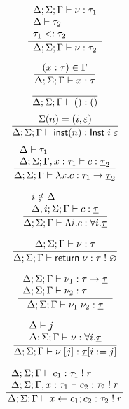 \[\frac{
	\begin{array}{l}
	\Delta;\Sigma;\Gamma \vdash \nu : \tau_1 \\
	\Delta \vdash \tau_2 \\
	\tau_1 <: \tau_2
	\end{array}
}{
	\Delta;\Sigma;\Gamma \vdash \nu : \tau_2
}\]

\[\frac{
	(x:\tau) \in \Gamma
}{
	\Delta;\Sigma;\Gamma \vdash x : \tau
}\]
\[\frac{
}{
	\Delta;\Sigma;\Gamma \vdash () : ()
}\]
\[\frac{
	\Sigma(n) = (i, \varepsilon)
}{
	\Delta;\Sigma;\Gamma \vdash \mathsf{inst}(n) : \mathsf{Inst} \; i \; \varepsilon
}\]
\[\frac{
	\begin{array}{l}
	\Delta \vdash \tau_1 \\
	\Delta;\Sigma;\Gamma, x : \tau_1 \vdash c : \underline{\tau}_2
	\end{array}
}{
	\Delta;\Sigma;\Gamma \vdash \lambda x . c : \tau_1 \rightarrow \underline{\tau}_2
}\]

\[\frac{
	\begin{array}{l}
	i \notin \Delta\\
	\Delta,i;\Sigma;\Gamma \vdash c : \underline{\tau}
	\end{array}
}{
	\Delta;\Sigma;\Gamma \vdash \Lambda i . c : \forall i . \underline{\tau}
}\]

\[\frac{
	\begin{array}{l}
	\Delta;\Sigma;\Gamma \vdash \nu : \tau
	\end{array}
}{
	\Delta;\Sigma;\Gamma \vdash \mathsf{return} \; \nu : \tau \; ! \; \varnothing
}\]

\[\frac{
	\begin{array}{l}
	\Delta;\Sigma;\Gamma \vdash \nu_1 : \tau \rightarrow \underline{\tau}\\
	\Delta;\Sigma;\Gamma \vdash \nu_2 : \tau
	\end{array}
}{
	\Delta;\Sigma;\Gamma \vdash \nu_1 \; \nu_2 : \underline{\tau}
}\]

\[\frac{
	\begin{array}{l}
	\Delta \vdash j \\
	\Delta;\Sigma;\Gamma \vdash \nu : \forall i . \underline{\tau}
	\end{array}
}{
	\Delta;\Sigma;\Gamma \vdash \nu \; [ j ] : \underline{\tau}[i := j]
}\]

\[\frac{
	\begin{array}{l}
	\Delta;\Sigma;\Gamma \vdash c_1 : \tau_1 \; ! \; r \\
	\Delta;\Sigma;\Gamma,x:\tau_1 \vdash c_2 : \tau_2 \; ! \; r \\
	\end{array}
}{
	\Delta;\Sigma;\Gamma \vdash x \leftarrow c_1 ; c_2 : \tau_2 \; ! \; r
}\]

